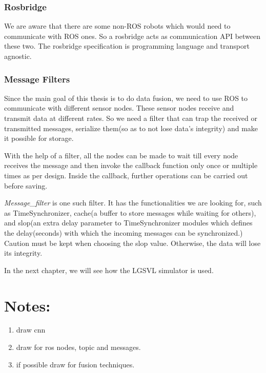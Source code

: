 \subsubsection*{Rosbridge}
We are aware that there are some non-ROS robots which would need to communicate with ROS
ones. So a rosbridge \cite{rosbridge} acts as communication API between these two. The rosbridge
specification is programming language and transport agnostic.

\subsubsection*{Message Filters}
Since the main goal of this thesis is to do data fusion, we need to use ROS to communicate
with different sensor nodes. These sensor nodes receive and transmit data at different rates.
So we need a filter that can trap the received or transmitted messages, serialize them(so
as to not lose data's integrity) and make it possible for storage.

With the help of a filter, all the nodes can be made to wait till every node receives the message and then
invoke the callback function only once or multiple times as per design. Inside the callback, further operations can be
carried out before saving.

\textit{Message\_filter} \cite{messagefilters} is one such filter. It has the
functionalities we are looking for, such as TimeSynchronizer, cache(a buffer to store
messages while waiting for others), and slop(an extra delay parameter to TimeSynchronizer
modules which defines the delay(seconds) with which the incoming messages can be
synchronized.) Caution must be kept when choosing the slop value. Otherwise, the data will
lose its integrity.

In the next chapter, we will see how the LGSVL \cite{rong2020lgsvl} simulator is used.


\section{Notes:}
\begin{enumerate}
    \item draw cnn
    \item draw for ros nodes, topic and messages.
    \item if possible draw for fusion techniques.
\end{enumerate}




